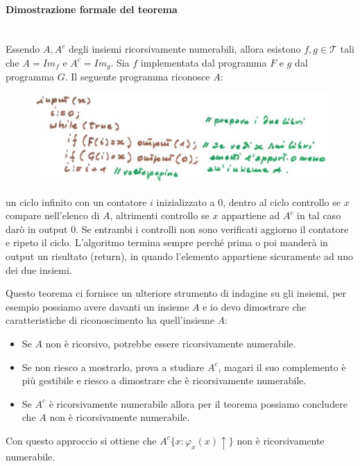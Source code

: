 \documentclass{article}
\begin{document}
\paragraph{Dimostrazione formale del teorema}\mbox{}\\
Essendo $A,A^c$ degli insiemi ricorsivamente numerabili, allora
esistono $f,g\in\mathcal{T}$ tali che $A=Im_f$ e $A^c=Im_g$. Sia $f$ implementata
dal programma $F$ e $g$ dal programma $G$. Il seguente programma riconosce $A$:
\begin{figure}[H]
    \centering
    \includegraphics[scale=0.5]{images/prog_per_a.png}
\end{figure}
un ciclo infinito con un contatore $i$ inizializzato a 0, dentro al ciclo controllo
se $x$ compare nell'elenco di $A$, altrimenti controllo se $x$ appartiene ad $A^c$
in tal caso darò in output 0. Se entrambi i controlli non sono verificati
aggiorno il contatore e ripeto il ciclo.
L'algoritmo termina sempre perché prima o poi manderà in output un risultato (return),
in quando l'elemento appartiene sicuramente ad uno dei due insiemi.

Questo teorema ci fornisce un ulteriore strumento di indagine su gli insiemi, per esempio
possiamo avere davanti un insieme $A$ e io devo dimostrare che caratteristiche
di riconoscimento ha quell'insieme $A$:
\begin{itemize}
    \item Se $A$ non è ricorsivo, potrebbe essere ricorsivamente numerabile.
    \item Se non riesco a mostrarlo, prova a studiare $A^c$, magari il suo complemento
          è più gestibile e riesco a dimostrare che è ricorsivamente numerabile.
    \item Se $A^c$ è ricorsivamente numerabile allora per il teorema possiamo concludere che
          $A$ non è ricorsivamente numerabile.
\end{itemize}
Con questo approccio si ottiene che $A^c\{x:\varphi_x(x)\uparrow\}$ non è ricorsivamente
numerabile.
\end{document}
